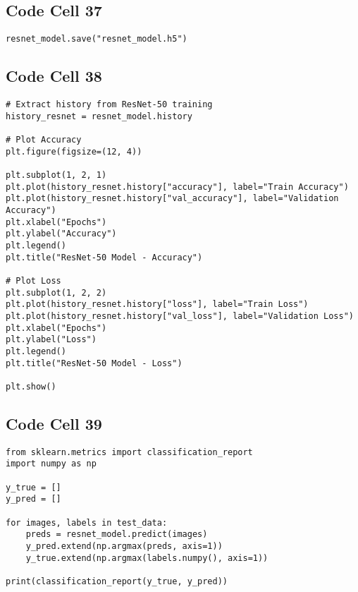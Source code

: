 \documentclass{article}
\begin{document}
\subsection*{Code Cell 37}
\begin{lstlisting}
resnet_model.save("resnet_model.h5")
\end{lstlisting}

\subsection*{Code Cell 38}
\begin{lstlisting}
# Extract history from ResNet-50 training
history_resnet = resnet_model.history

# Plot Accuracy
plt.figure(figsize=(12, 4))

plt.subplot(1, 2, 1)
plt.plot(history_resnet.history["accuracy"], label="Train Accuracy")
plt.plot(history_resnet.history["val_accuracy"], label="Validation Accuracy")
plt.xlabel("Epochs")
plt.ylabel("Accuracy")
plt.legend()
plt.title("ResNet-50 Model - Accuracy")

# Plot Loss
plt.subplot(1, 2, 2)
plt.plot(history_resnet.history["loss"], label="Train Loss")
plt.plot(history_resnet.history["val_loss"], label="Validation Loss")
plt.xlabel("Epochs")
plt.ylabel("Loss")
plt.legend()
plt.title("ResNet-50 Model - Loss")

plt.show()
\end{lstlisting}

\subsection*{Code Cell 39}
\begin{lstlisting}
from sklearn.metrics import classification_report
import numpy as np

y_true = []
y_pred = []

for images, labels in test_data:
    preds = resnet_model.predict(images)
    y_pred.extend(np.argmax(preds, axis=1))
    y_true.extend(np.argmax(labels.numpy(), axis=1))

print(classification_report(y_true, y_pred))
\end{lstlisting}
\end{document}
